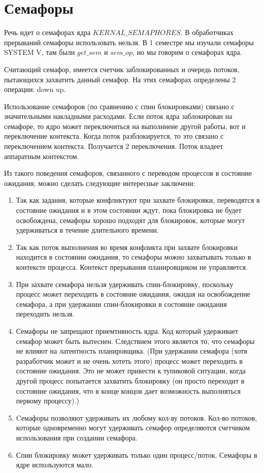 \section{Семафоры}

Речь идет о семафорах ядра $KERNAL\_SEMAPHORES$. В обработчиках прерываний семафоры использовать нельзя. 
В 1 семестре мы изучали семафоры SYSTEM V, там были $get\_sem$ и $sem\_op$, но мы говорим о семафорах ядра. 

Считающий семафор, имеется счетчик заблокированных и очередь потоков, пытающихся захватить данный семафор. На этих семафорах определены 2 операции: down up.

 

Использование семафоров (по сравнению с спин блокировками)  связано с значительными накладными расходами. 
Если поток ядра заблокирован на семафоре, то ядро может переключиться на выполннеие другой работы, вот и переключение контекста. Когда поток разблокируется, то это связано с переключением контекста.  Получается 2 переключения. Поток владеет аппаратным контекстом.

Из такого поведения семафоров, связанного с переводом процессов в состояние ожидания, можно сделать следующие интересные заключени: \cite{Lav_Linux_kernel}
\begin{enumerate}
	\item Так как задания, которые конфликтуют при захвате блокировки, переводятся в состояние ожидания и в этом состоянии ждут, пока блокировка не будет освобождена, семафоры хорошо подходят для блокировок, которые могут удерживаться в течение длительного времени.
	\item Так как поток выполнения во время конфликта при захвате блокировки находится в состоянии ожидания, то семафоры можно захватывать только в контексте процесса. Контекст прерывания планировщиком не управляется.
	\item  При захвате семафора нельзя удерживать спин-блокировку, поскольку процесс может переходить в состояние ожидания, ожидая на освобождение семафора, а при удержании спин-блокировки в состояние ожидания переходить нельзя.
	\item Семафоры не запрещают приемтивность ядра. Код который удерживает семафор может быть вытеснен.  Следствием этого является то, что семафоры не влияют на латентность планировщика. (При удержании семафора (хотя разработчик может и не очень хотеть этого) процесс может переходить в состояние ожидания. Это не может привести к тупиковой ситуации, когда другой процесс попытается захватить блокировку (он просто переходит в состояние ожидания, что в конце концов дает возможность выполняться первому процессу).)
	\item Cемафоры позволяют удерживать их любому кол-ву потоков.  Кол-во потоков, которые одновременно могут удерживать семафор определяются счетчиком использования при создании семафора.
	\item Спин блокировку может удерживать только один процесс/поток. Семафоры в ядре используются мало.
\end{enumerate}


